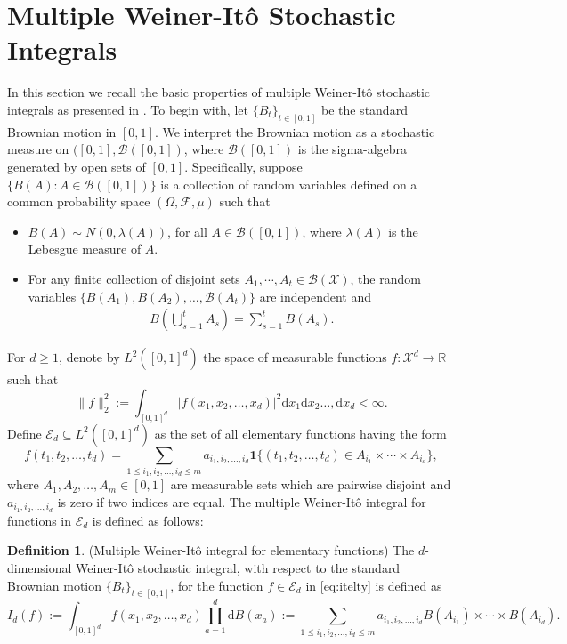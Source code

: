 \documentclass[11pt,reqno]{amsart}
\numberwithin{equation}{section}
\newcommand{\R}{{\mathbb R}}
\newcommand{\cF}{{\mathcal F}}
\theoremstyle{definition}
\newtheorem{definition}{Definition}[section]
\begin{document}
\section{Multiple Weiner-It\^{o} Stochastic Integrals}
\label{sec:stochasticintegral}


In this section we recall the basic properties of multiple Weiner-It\^{o} stochastic integrals as presented in \cite{stochasticintegral}. To begin with, let $\{B_t\}_{t \in [0, 1]}$ be the standard Brownian motion in $[0, 1]$. We interpret the Brownian motion as a stochastic measure on $([0, 1], \mathscr{B}([0, 1])$, 
where $\mathscr{B}([0, 1])$ is the sigma-algebra generated by open sets of $[0, 1]$. Specifically, suppose $\{B(A): A\in \mathscr{B}([0, 1])\}$ is a collection of random variables defined on a common probability space $(\Omega, \cF, \mu)$ such that 
\begin{itemize}
\item $B(A)\sim N(0, \lambda(A))$, for all $A\in \mathscr{B}([0, 1])$, where $\lambda(A)$ is the Lebesgue measure of $A$. 

\item For any finite collection of disjoint sets $A_{1},\cdots, A_{t} \in \mathscr B(\mathcal X)$, the random variables $\{B(A_1), B(A_2), \ldots, \mathcal B(A_t)\}$ are independent and 
\begin{align*}
B\left(\bigcup_{s=1}^{t}A_{s}\right) = \sum_{s=1}^{t}B(A_{s}).
\end{align*}
\end{itemize} 


For $d \geq 1$, denote by $L^2([0, 1]^d)$ the space of measurable functions $f: \mathcal X^d \rightarrow \R$ such that 
$$\|f\|_2^2:= \int_{[0, 1]^d} |f(x_1, x_2, \ldots, x_d)|^2 \mathrm d x_1 \mathrm d x_2 \ldots, \mathrm d x_d < \infty.$$ 
Define $\mathcal{E}_d \subseteq L^2([0, 1]^d)$ as the set of all elementary functions having the form
\begin{equation}\label{eq:itelty}
f(t_1, t_2, \ldots, t_d) =\sum_{1 \leq i_1, i_2, \ldots, i_d \leq m} a_{i_1, i_2, \ldots, i_d} \bm 1\{ (t_1, t_2, \ldots,  t_d) \in A_{i_1}\times \cdots \times A_{i_d} \}, 
\end{equation}
where $A_1, A_2, \ldots, A_m \in [0, 1]$ are measurable sets which are pairwise disjoint and $ a_{i_1, i_2, \ldots, i_d}$ is zero if two indices are equal. 
The multiple Weiner-It\^{o} integral for functions in $\mathcal{E}_d$ is defined as follows: 

\begin{definition}\label{defn:integral_elementary} (Multiple Weiner-It\^{o} integral for elementary functions) The $d$-dimensional Weiner-It\^{o} stochastic integral, with respect to the standard Brownian motion $\{B_t\}_{t \in [0, 1]}$, for the function $f \in \mathcal{E}_d $ in  \eqref{eq:itelty} is defined as 
$$I_d(f):=\int_{[0, 1]^d} f(x_1, x_2, \ldots, x_d) \prod_{a=1}^d \mathrm d B(x_a):=\sum_{1 \leq i_1, i_2, \ldots, i_d \leq m} a_{i_1, i_2, \ldots, i_d} B(A_{i_1})\times \cdots \times B(A_{i_d}).$$ 
\end{definition} 
\end{document}
